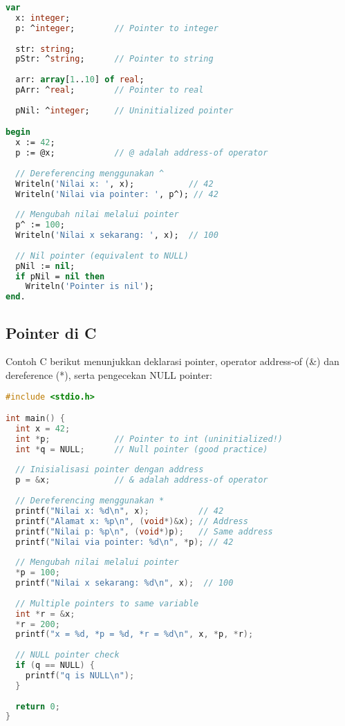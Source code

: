 \documentclass[../main.tex]{subfiles}
\begin{document}
\begin{lstlisting}[language=Pascal, caption={Deklarasi pointer di Pascal}]
var
  x: integer;
  p: ^integer;        // Pointer to integer
  
  str: string;
  pStr: ^string;      // Pointer to string
  
  arr: array[1..10] of real;
  pArr: ^real;        // Pointer to real
  
  pNil: ^integer;     // Uninitialized pointer

begin
  x := 42;
  p := @x;            // @ adalah address-of operator
  
  // Dereferencing menggunakan ^
  Writeln('Nilai x: ', x);           // 42
  Writeln('Nilai via pointer: ', p^); // 42
  
  // Mengubah nilai melalui pointer
  p^ := 100;
  Writeln('Nilai x sekarang: ', x);  // 100
  
  // Nil pointer (equivalent to NULL)
  pNil := nil;
  if pNil = nil then
    Writeln('Pointer is nil');
end.
\end{lstlisting}

\subsection{Pointer di C}

Contoh C berikut menunjukkan deklarasi pointer, operator address-of (\&) dan dereference (*), serta pengecekan NULL pointer:

\begin{lstlisting}[language=C, caption={Deklarasi pointer di C}]
#include <stdio.h>

int main() {
  int x = 42;
  int *p;             // Pointer to int (uninitialized!)
  int *q = NULL;      // Null pointer (good practice)
  
  // Inisialisasi pointer dengan address
  p = &x;             // & adalah address-of operator
  
  // Dereferencing menggunakan *
  printf("Nilai x: %d\n", x);          // 42
  printf("Alamat x: %p\n", (void*)&x); // Address
  printf("Nilai p: %p\n", (void*)p);   // Same address
  printf("Nilai via pointer: %d\n", *p); // 42
  
  // Mengubah nilai melalui pointer
  *p = 100;
  printf("Nilai x sekarang: %d\n", x);  // 100
  
  // Multiple pointers to same variable
  int *r = &x;
  *r = 200;
  printf("x = %d, *p = %d, *r = %d\n", x, *p, *r);
  
  // NULL pointer check
  if (q == NULL) {
    printf("q is NULL\n");
  }
  
  return 0;
}
\end{lstlisting}
\end{document}
